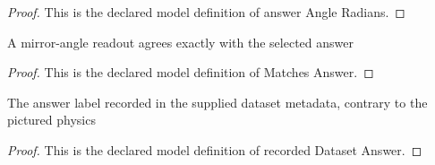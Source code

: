 \begin{proof}
  This is the declared model definition of answer Angle Radians.
\end{proof}
\begin{definition}
  \label{def:physics:phyx-mini-0060:phyxminiproblems-problemphyxmini0060-matchesanswer}
  A mirror-angle readout agrees exactly with the selected answer
\end{definition}
\begin{proof}
  This is the declared model definition of Matches Answer.
\end{proof}
\begin{definition}
  \label{def:physics:phyx-mini-0060:phyxminiproblems-problemphyxmini0060-recordeddatasetanswer}
  The answer label recorded in the supplied dataset metadata, contrary to the pictured physics
\end{definition}
\begin{proof}
  This is the declared model definition of recorded Dataset Answer.
\end{proof}

